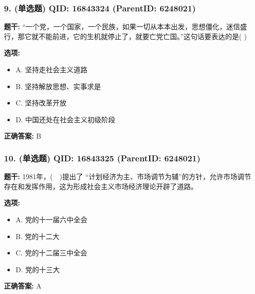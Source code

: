 \documentclass[12pt,UTF8]{ctexart}
\begin{document}
\subsubsection*{9. (单选题) \small QID: 16843324 (ParentID: 6248021)}

\textbf{题干:}
“一个党，一个国家，一个民族，如果一切从本本出发，思想僵化，迷信盛行，那它就不能前进，它的生机就停止了，就要亡党亡国。”这句话要表达的是( )



\textbf{选项:}
\begin{itemize}[leftmargin=*]

  \item A. 坚持走社会主义道路

  \item B. 坚持解放思想、实事求是

  \item C. 坚持改革开放

  \item D. 中国还处在社会主义初级阶段

\end{itemize}

\textbf{正确答案:}
B

\vspace{0.3em}\hrulefill\vspace{0.7em}

\subsubsection*{10. (单选题) \small QID: 16843325 (ParentID: 6248021)}

\textbf{题干:}
1981年，(  )提出了 “计划经济为主、市场调节为辅”的方针，允许市场调节存在和发挥作用，这为形成社会主义市场经济理论开辟了道路。



\textbf{选项:}
\begin{itemize}[leftmargin=*]

  \item A. 党的十一届六中全会

  \item B. 党的十二大

  \item C. 党的十二届三中全会

  \item D. 党的十三大

\end{itemize}

\textbf{正确答案:}
A
\end{document}
